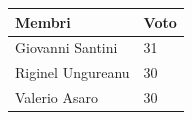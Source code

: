 \documentclass{report}
\begin{document}
\begin{center} %
	\centering
	\begin{tabular}{ |p{3cm}|p{1cm}|  }
		\hline
		\centering  Membri  & Voto\\ %
		\hline
		\centering Giovanni Santini & 31 \\
		\hline
		\centering Riginel Ungureanu & 30  \\
		\hline
		\centering Valerio Asaro & 30  \\
		\hline
	\end{tabular}
\end{center}



	
\end{document}
